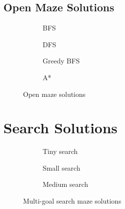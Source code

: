 \documentclass{article}
\begin{document}
\subsection{Open Maze Solutions}
\begin{figure}[H]
\centering
\begin{subfigure}{.5\textwidth}
\caption{BFS}
\label{fig:openMaze:bfs}
\end{subfigure}%
\begin{subfigure}{.5\textwidth}
\label{fig:openMaze:dfs}
\caption{DFS}
\end{subfigure}
\begin{subfigure}{.5\textwidth}
\label{fig:openMaze:gbfs}
\caption{Greedy BFS}
\end{subfigure}%
\begin{subfigure}{.5\textwidth}
\label{fig:openMaze:astar}
\caption{A*}
\end{subfigure}%

\caption{Open maze solutions}
\end{figure}

\newpage

\section{Search Solutions}
\label{sect:searchSolns}
\begin{figure}[H]
\centering
\begin{subfigure}{.25\textwidth}
\caption{Tiny search}
\label{fig:tinySearch:astar}
\end{subfigure}%
\begin{subfigure}{.25\textwidth}
\label{fig:smallSearch:dfs}
\caption{Small search}
\end{subfigure}
\begin{subfigure}{.5\textwidth}
\label{fig:mediumSearch:astar}
\caption{Medium search}
\end{subfigure}%

\caption{Multi-goal search maze solutions}
\end{figure}

\restoregeometry
\end{document}
